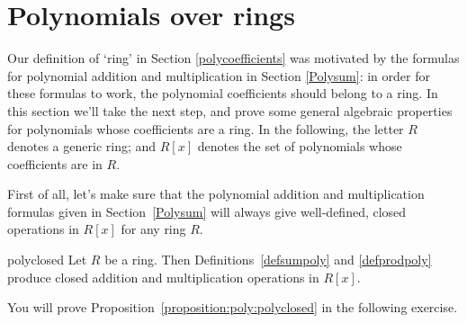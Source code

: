 %
%
%
%
%



\section{Polynomials over rings}\label{polyringring}

Our definition of `ring' in Section \ref{polycoefficients} was motivated by the formulas for polynomial addition and  multiplication   in Section \ref{Polysum}: in order for these formulas to work, the polynomial coefficients should belong to a ring. In this section we'll take the next step, and prove some general algebraic properties for polynomials whose coefficients  are a ring. 
In the following,  the letter $R$ denotes a generic ring; and $R[x]$ denotes the set of polynomials  whose coefficients are in $R$.

First of all, let's make sure that the polynomial addition and multiplication formulas given in Section~\ref{Polysum} will always give well-defined, closed operations in $R[x]$ for any ring $R$. 

\begin{prop}{polyclosed} Let $R$ be a ring. Then Definitions~\ref{defsumpoly} and \ref{defprodpoly} produce  closed addition and multiplication operations in $R[x]$.
\end{prop}

You will prove Proposition~\ref{proposition:poly:polyclosed} in the following exercise.

